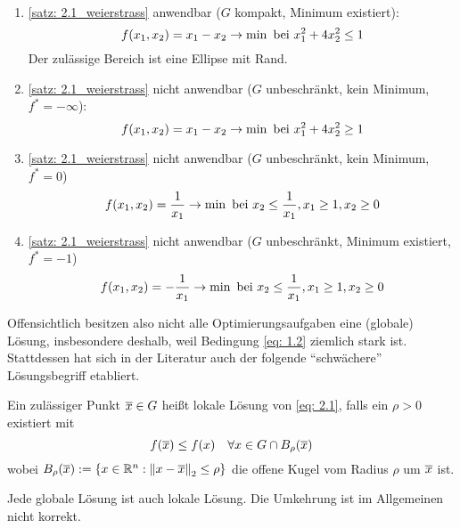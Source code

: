 \begin{beispiel}
	~
	\begin{enumerate}[nolistsep, leftmargin=*, topsep=-\parskip]
		\item \cref{satz: 2.1_weierstrass} anwendbar ($G$ kompakt, Minimum existiert):
		\begin{equation*}
			f(x_1,x_2) = x_1 - x_2 \to \min \text{ bei } x_1^2 + 4x_2^2 \le 1
		\end{equation*}
		Der zulässige Bereich ist eine Ellipse mit Rand.
		\item \cref{satz: 2.1_weierstrass} nicht anwendbar ($G$ unbeschränkt, kein Minimum, $f^\ast = -\infty$):
		\begin{equation*}
			f(x_1,x_2) = x_1 - x_2 \to \min \text{ bei } x_1^2 + 4x_2^2 \ge 1
		\end{equation*}
		\item \cref{satz: 2.1_weierstrass} nicht anwendbar ($G$ unbeschränkt, kein Minimum, $f^\ast = 0$)
		\begin{equation*}
			f(x_1,x_2) = \frac{1}{x_1} \to \min \text{ bei } x_2 \le \frac{1}{x_1}, x_1 \ge 1, x_2 \ge 0
		\end{equation*}
		\item \cref{satz: 2.1_weierstrass} nicht anwendbar ($G$ unbeschränkt, Minimum existiert, $f^\ast = -1$)
		\begin{equation*}
			f(x_1,x_2) = - \frac{1}{x_1} \to \min \text{ bei } x_2 \le \frac{1}{x_1}, x_1 \ge 1, x_2 \ge 0
		\end{equation*}
	\end{enumerate}
\end{beispiel}

Offensichtlich besitzen also nicht alle Optimierungsaufgaben eine (globale) Lösung, insbesondere deshalb, weil Bedingung \eqref{eq: 1.2} ziemlich stark ist. Stattdessen hat sich in der Literatur auch der folgende \enquote{schwächere} Lösungsbegriff etabliert.

\begin{definition}
	Ein zulässiger Punkt $\overline{x} \in G$ heißt lokale Lösung von \eqref{eq: 2.1}, falls ein $\rho > 0$ existiert mit 
	\begin{equation*}
		f(\overline{x}) \le f(x) \quad \forall x \in G \cap B_\rho(\overline{x})
	\end{equation*}
	wobei $B_\rho(\overline{x}) \mathrel{:=} \left\{ x \in \mathbb{R}^n : \left\lVert x - \overline{x} \right\rVert_2 \le \rho \right\}$ die offene Kugel vom Radius $\rho$ um $\overline{x}$ ist.
\end{definition}

\begin{bemerkung}
	Jede globale Lösung ist auch lokale Lösung. Die Umkehrung ist im Allgemeinen nicht korrekt.
\end{bemerkung}

